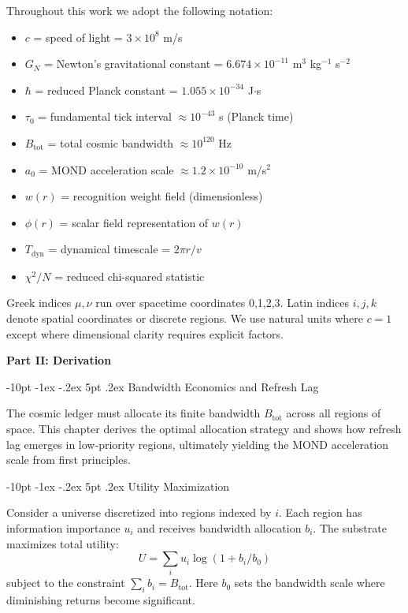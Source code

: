 \documentclass[12pt,letterpaper]{book}
\makeatletter
\renewcommand\section{\@startsection{section}{1}{\z@}%
  {-8pt \@plus -1ex \@minus -.2ex}%
  {4pt \@plus.2ex}%
  {\normalfont\large\bfseries}}
\renewcommand\section{\@startsection {section}{1}{\z@}%
                {-10pt \@plus -1ex \@minus -.2ex}%
                {5pt \@plus.2ex}%
                {\normalfont\large\bfseries}}
\makeatother
\begin{document}
Throughout this work we adopt the following notation:
\begin{itemize}
\item $c$ = speed of light = $3 \times 10^8$ m/s
\item $G_N$ = Newton's gravitational constant = $6.674 \times 10^{-11}$ m$^3$ kg$^{-1}$ s$^{-2}$
\item $\hbar$ = reduced Planck constant = $1.055 \times 10^{-34}$ J$\cdot$s
\item $\tau_0$ = fundamental tick interval $\approx 10^{-43}$ s (Planck time)
\item $B_{\text{tot}}$ = total cosmic bandwidth $\approx 10^{120}$ Hz
\item $a_0$ = MOND acceleration scale $\approx 1.2 \times 10^{-10}$ m/s$^2$
\item $w(r)$ = recognition weight field (dimensionless)
\item $\phi(r)$ = scalar field representation of $w(r)$
\item $T_{\text{dyn}}$ = dynamical timescale = $2\pi r/v$
\item $\chi^2/N$ = reduced chi-squared statistic
\end{itemize}

Greek indices $\mu, \nu$ run over spacetime coordinates 0,1,2,3. Latin indices $i,j,k$ denote spatial coordinates or discrete regions. We use natural units where $c = 1$ except where dimensional clarity requires explicit factors.

\textbf{Part II: Derivation}
\label{part:derivation}

\section{Bandwidth Economics and Refresh Lag}
\label{chap:bandwidth}

The cosmic ledger must allocate its finite bandwidth $B_{\text{tot}}$ across all regions of space. This chapter derives the optimal allocation strategy and shows how refresh lag emerges in low-priority regions, ultimately yielding the MOND acceleration scale from first principles.

\section{Utility Maximization}

Consider a universe discretized into regions indexed by $i$. Each region has information importance $u_i$ and receives bandwidth allocation $b_i$. The substrate maximizes total utility:
\begin{equation}
U = \sum_i u_i \log(1 + b_i/b_0)
\end{equation}
subject to the constraint $\sum_i b_i = B_{\text{tot}}$. Here $b_0$ sets the bandwidth scale where diminishing returns become significant.
\end{document}
